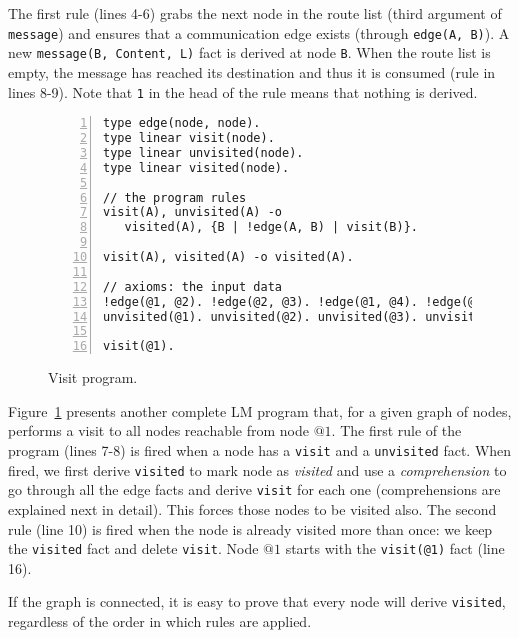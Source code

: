 The first rule (lines 4-6) grabs the next node in the route list (third argument of \texttt{message}) and
ensures that a communication edge exists (through \texttt{edge(A, B)}).
A new \texttt{message(B,~Content,~L)} fact is derived at node \texttt{B}.
When the route list is empty, the message has reached its destination and thus it is consumed
(rule in lines 8-9). Note that \texttt{1} in the head of the rule means that nothing is derived.

\begin{figure}[h!]
\small\begin{Verbatim}[numbers=left]
type edge(node, node).
type linear visit(node).
type linear unvisited(node).
type linear visited(node).

// the program rules
visit(A), unvisited(A) -o
   visited(A), {B | !edge(A, B) | visit(B)}.

visit(A), visited(A) -o visited(A).

// axioms: the input data
!edge(@1, @2). !edge(@2, @3). !edge(@1, @4). !edge(@2, @4).
unvisited(@1). unvisited(@2). unvisited(@3). unvisited(@4).

visit(@1).
\end{Verbatim}
  \caption{Visit program.}
  \label{code:visit}
\end{figure}
\normalsize

Figure~\ref{code:visit} presents another complete LM program that, for a given graph
of nodes, performs a visit to all nodes reachable from node $@1$.
The first rule of the program (lines 7-8) is fired when a node has a \texttt{visit} and a \texttt{unvisited} fact.
When fired, we first derive \texttt{visited} to mark node as \textit{visited} and use a
\emph{comprehension} to go through all the edge facts and derive \texttt{visit} for each
one (comprehensions are explained next in detail). This forces those nodes to be visited also.
The second rule (line 10) is fired when the
node is already visited more than once: we keep the \texttt{visited} fact and delete \texttt{visit}.
Node $@1$ starts with the \texttt{visit(@1)} fact (line 16).

If the graph is connected, it is easy to prove that every node will derive \texttt{visited},
regardless of the order in which rules are applied.